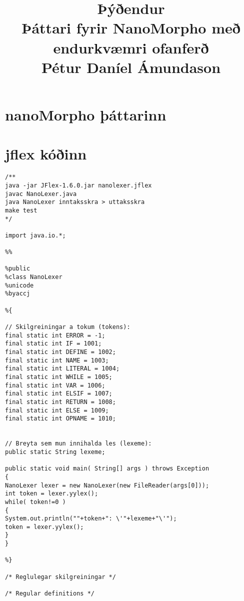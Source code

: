 \documentclass[]{article}
\begin{document}
\title{Þýðendur \\
	Þáttari fyrir NanoMorpho með endurkvæmri ofanferð\\
	Pétur Daníel Ámundason\\
	}
\maketitle

\section*{nanoMorpho þáttarinn}

\section*{jflex kóðinn}
\begin{lstlisting}
/**
java -jar JFlex-1.6.0.jar nanolexer.jflex
javac NanoLexer.java
java NanoLexer inntaksskra > uttaksskra
make test
*/

import java.io.*;

%%

%public
%class NanoLexer
%unicode
%byaccj

%{

// Skilgreiningar a tokum (tokens):
final static int ERROR = -1;
final static int IF = 1001;
final static int DEFINE = 1002;
final static int NAME = 1003;
final static int LITERAL = 1004;
final static int WHILE = 1005;
final static int VAR = 1006;
final static int ELSIF = 1007;
final static int RETURN = 1008;
final static int ELSE = 1009;
final static int OPNAME = 1010;


// Breyta sem mun innihalda les (lexeme):
public static String lexeme;

public static void main( String[] args ) throws Exception
{
NanoLexer lexer = new NanoLexer(new FileReader(args[0]));
int token = lexer.yylex();
while( token!=0 )
{
System.out.println(""+token+": \'"+lexeme+"\'");
token = lexer.yylex();
}
}

%}

/* Reglulegar skilgreiningar */

/* Regular definitions */


\end{lstlisting}
\end{document}
